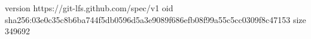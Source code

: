 version https://git-lfs.github.com/spec/v1
oid sha256:03e0c35c8b6ba744f5db0596d5a3e9089f686efb08f99a55c5cc0309f8c47153
size 349692
